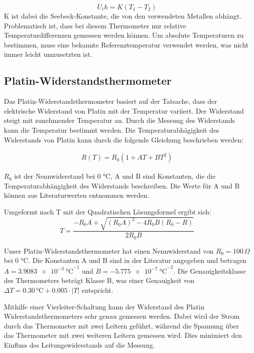 \documentclass[12pt,a4paper,titlepage]{scrartcl}
\numberwithin{equation}{section}
\numberwithin{table}{section}
\numberwithin{figure}{section}
\begin{document}
\begin{equation}
    U_th = K  (T_1 - T_2)
\end{equation}
K ist dabei die Seebeck-Konstante, die von den verwendeten Metallen abhängt.
Problematisch ist, dass bei diesem Thermometer nur relative Temperaturdifferenzen gemessen werden können. Um absolute Temperaturen zu bestimmen, muss eine bekannte Referenztemperatur verwendet werden, was nicht immer leicht umzusetzten ist.

\subsection{Platin-Widerstandsthermometer}
Das Platin-Widerstandsthermometer basiert auf der Tatsache, dass der elektrische Widerstand von Platin mit der Temperatur variiert. Der Widerstand steigt mit zunehmender Temperatur an. Durch die Messung des Widerstands kann die Temperatur bestimmt werden.
Die Temperaturabhägigkeit des Widerstands von Platin kann durch die folgende Gleichung beschrieben werden:

\begin{align}
    R(T) = R_0  (1 + AT + BT^2)\label{eq:Widerstandpt100}
\end{align}

$R_0$ ist der Nennwiderstand bei 0 °C, A und B sind Konstanten, die die Temperaturabhängigkeit des Widerstands beschreiben. Die Werte für A und B können aus Literaturwerten entnommen werden.

Umgeformt nach T mit der Quadratischen Lösungsformel ergibt sich:
\begin{equation}
    T = \frac{-R_0  A + \sqrt{(R_0  A)^2 - 4  R_0  B  (R_0 - R)}}{2  R_0  B}
\end{equation}

Unser Platin-Widerstandsthermometer hat einen Nennwiderstand von $R_0 = 100\,\Omega$ bei 0 °C. Die Konstanten A und B sind in der Literatur angegeben und betragen $A = \qty{3.9083e-3}{\degreeCelsius}^{-1}$ und $B = \qty{-5.775e-7}{\degreeCelsius}^{-2}$. Die Genauigkeitsklasse des Thermometers beträgt Klasse B, was einer Genauigkeit von $\Delta T = 0.30\,\si{\degreeCelsius} + 0.005 \cdot \lvert T \rvert$ entspricht.

Mithilfe einer Vierleiter-Schaltung kann der Widerstand des Platin Widerstandsthermometers sehr genau gemessen werden. Dabei wird der Strom durch das Thermometer mit zwei Leitern geführt, während die Spannung über das Thermometer mit zwei weiteren Leitern gemessen wird. Dies minimiert den Einfluss des Leitungswiderstands auf die Messung.
\end{document}
